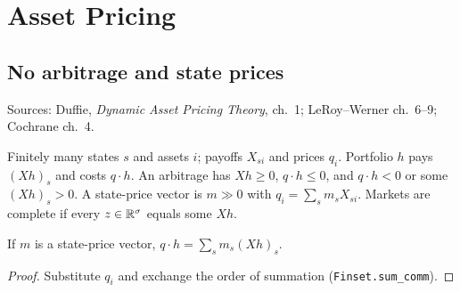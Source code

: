 \chapter{Asset Pricing}
\label{chap:finance}

\section{No arbitrage and state prices}
\label{sec:ftap}

Sources: Duffie, \emph{Dynamic Asset Pricing Theory}, ch.~1; LeRoy--Werner ch.~6--9; Cochrane ch.~4.

\begin{definition}
\label{def:ftap_market}
\leanok
Finitely many states $s$ and assets $i$; payoffs $X_{si}$ and prices $q_i$. Portfolio $h$ pays $(Xh)_s$ and costs
$q\cdot h$. An arbitrage has $Xh \ge 0$, $q\cdot h \le 0$, and $q\cdot h < 0$ or some $(Xh)_s > 0$. A state-price vector
is $m \gg 0$ with $q_i = \sum_s m_sX_{si}$. Markets are complete if every $z \in \mathbb{R}^\sigma$ equals some $Xh$.
\end{definition}

\begin{lemma}
\label{lem:ftap_cost_eq}
\leanok
{}
If $m$ is a state-price vector, $q\cdot h = \sum_s m_s(Xh)_s$.
\end{lemma}
\begin{proof}
\leanok
Substitute $q_i$ and exchange the order of summation (\texttt{Finset.sum\_comm}).
\end{proof}

